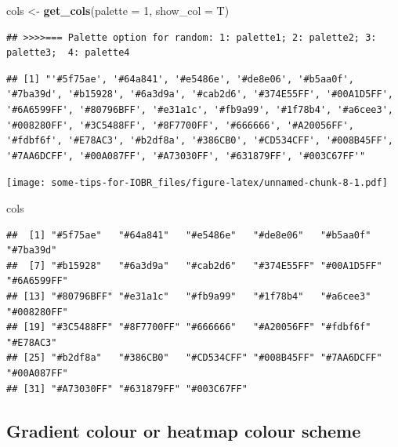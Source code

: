 \documentclass[
  12pt,
]{book}
\newenvironment{Shaded}{\begin{snugshade}}{\end{snugshade}}
\newcommand{\AttributeTok}[1]{\textcolor[rgb]{0.13,0.29,0.53}{#1}}
\newcommand{\DecValTok}[1]{\textcolor[rgb]{0.00,0.00,0.81}{#1}}
\newcommand{\FunctionTok}[1]{\textcolor[rgb]{0.13,0.29,0.53}{\textbf{#1}}}
\newcommand{\NormalTok}[1]{#1}
\newcommand{\OtherTok}[1]{\textcolor[rgb]{0.56,0.35,0.01}{#1}}
\begin{document}
\begin{Shaded}
\begin{Highlighting}[]
\NormalTok{cols }\OtherTok{\textless{}{-}} \FunctionTok{get\_cols}\NormalTok{(}\AttributeTok{palette =} \DecValTok{1}\NormalTok{, }\AttributeTok{show\_col =}\NormalTok{ T)}
\end{Highlighting}
\end{Shaded}

\begin{verbatim}
## >>>>=== Palette option for random: 1: palette1; 2: palette2; 3: palette3;  4: palette4
\end{verbatim}

\begin{verbatim}
## [1] "'#5f75ae', '#64a841', '#e5486e', '#de8e06', '#b5aa0f', '#7ba39d', '#b15928', '#6a3d9a', '#cab2d6', '#374E55FF', '#00A1D5FF', '#6A6599FF', '#80796BFF', '#e31a1c', '#fb9a99', '#1f78b4', '#a6cee3', '#008280FF', '#3C5488FF', '#8F7700FF', '#666666', '#A20056FF', '#fdbf6f', '#E78AC3', '#b2df8a', '#386CB0', '#CD534CFF', '#008B45FF', '#7AA6DCFF', '#00A087FF', '#A73030FF', '#631879FF', '#003C67FF'"
\end{verbatim}

\texttt{[image: some-tips-for-IOBR\_files/figure-latex/unnamed-chunk-8-1.pdf]}

\begin{Shaded}
\begin{Highlighting}[]
\NormalTok{cols}
\end{Highlighting}
\end{Shaded}

\begin{verbatim}
##  [1] "#5f75ae"   "#64a841"   "#e5486e"   "#de8e06"   "#b5aa0f"   "#7ba39d"  
##  [7] "#b15928"   "#6a3d9a"   "#cab2d6"   "#374E55FF" "#00A1D5FF" "#6A6599FF"
## [13] "#80796BFF" "#e31a1c"   "#fb9a99"   "#1f78b4"   "#a6cee3"   "#008280FF"
## [19] "#3C5488FF" "#8F7700FF" "#666666"   "#A20056FF" "#fdbf6f"   "#E78AC3"  
## [25] "#b2df8a"   "#386CB0"   "#CD534CFF" "#008B45FF" "#7AA6DCFF" "#00A087FF"
## [31] "#A73030FF" "#631879FF" "#003C67FF"
\end{verbatim}

\hypertarget{gradient-colour-or-heatmap-colour-scheme}{%
\subsection{Gradient colour or heatmap colour scheme}\label{gradient-colour-or-heatmap-colour-scheme}}
\end{document}
